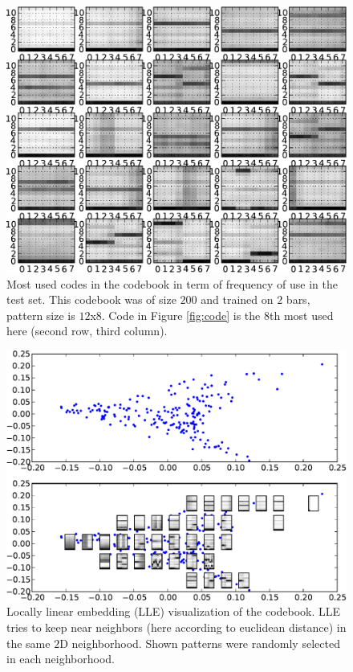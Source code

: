 \documentclass{article}
\begin{document}
\begin{figure}[htb]
\begin{center}
\includegraphics[width=.9\columnwidth]{codes1}
\end{center}
\caption{\small{
Most used codes in the codebook in term of frequency of use in the test
set. This codebook was of size $200$ and trained on $2$ bars, pattern
size is $12$x$8$. Code in Figure \ref{fig:code} is the $8$th most used
here (second row, third column).
}}
\label{fig:codes1}
\end{figure}

\begin{figure}[htb]
\begin{center}
\includegraphics[width=.9\columnwidth]{codes_lle}
\end{center}
\caption{\small{
Locally linear embedding (LLE) visualization of the codebook.
LLE tries to keep near neighbors (here according to euclidean distance)
in the same $2$D neighborhood. Shown patterns were randomly selected
in each neighborhood.
}}
\label{fig:lle}
\end{figure}
\end{document}
